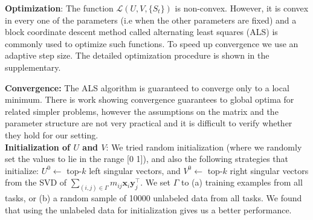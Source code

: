 \documentclass{bioinfo}
\begin{document}
%

\noindent \textbf{Optimization}:
The function $\mathcal{L}(U, V, \{S_t\})$ is non-convex. However, it is convex in every one of the parameters (i.e when the other parameters are fixed) 
and a block coordinate descent method called alternating least squares (ALS) is commonly used to optimize such functions. 
To speed up convergence we use an adaptive step size. The detailed optimization procedure is shown in the supplementary.

\noindent \textbf{Convergence:} The ALS algorithm is guaranteed to converge only to a local minimum. There is work showing convergence guarantees to global optima for related simpler problems, however the assumptions on the matrix and the parameter structure are not very practical and 
it is difficult to verify whether they hold for our setting. \\
\noindent \textbf{Initialization of $U$ and $V$}: We tried random initialization (where we randomly set the values to lie in the range [0 1]), and also 
the following strategies that initialize: $U^0 \leftarrow$ top-$k$ left singular vectors, and $V^0 \leftarrow$ top-$k$ right singular vectors from 
the SVD of $\displaystyle{\sum_{(i,j) \in \Gamma}} m_{ij} \mathbf{x}_i \mathbf{y}_j^\intercal$. We set $\Gamma$ to 
(a) training examples from all tasks, or (b) a random sample of 10000 unlabeled data from all tasks. We found that using the unlabeled data for initialization gives us a better performance.

\end{document}
